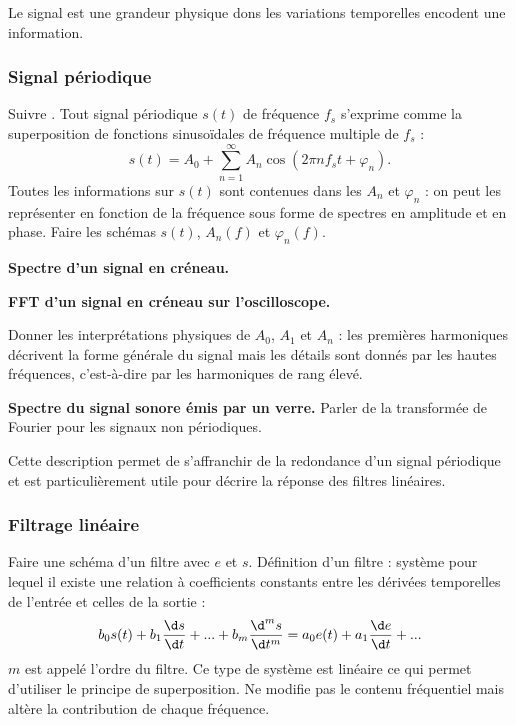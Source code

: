 Le signal est une grandeur physique dons les variations temporelles encodent une information.

\subsubsection{Signal périodique}

Suivre \cite{Salamito2017}.
Tout signal périodique $s(t)$ de fréquence $f_s$ s'exprime comme la superposition de fonctions sinusoïdales de fréquence multiple de $f_s$ :
\begin{equation}
s(t) = A_0 + \sum_{n=1}^\infty A_n \cos(2\pi n f_s t + \varphi_n).
\end{equation}
Toutes les informations sur $s(t)$ sont contenues dans les $A_n$ et $\varphi_n$ : on peut les représenter en fonction de la fréquence sous forme de spectres en amplitude et en phase.
Faire les schémas $s(t)$, $A_n(f)$ et $\varphi_n(f)$.

\begin{slide}
\textbf{Spectre d'un signal en créneau.}
\end{slide}

\begin{experience}
\textbf{FFT d'un signal en créneau sur l'oscilloscope.}
\end{experience}

Donner les interprétations physiques de $A_0$, $A_1$ et $A_n$ : les premières harmoniques décrivent la forme générale du signal mais les détails sont donnés par les hautes fréquences, c'est-à-dire par les harmoniques de rang élevé.

\begin{slide}
\textbf{Spectre du signal sonore émis par un verre.}
Parler de la transformée de Fourier pour les signaux non périodiques. 
\end{slide}

\begin{transition}
Cette description permet de s'affranchir de la redondance d'un signal périodique et est particulièrement utile pour décrire la réponse des filtres linéaires.
\end{transition}

\subsubsection{Filtrage linéaire}

Faire une schéma d'un filtre avec $e$ et $s$.
Définition d'un filtre : système pour lequel il existe une relation à coefficients constants entre les dérivées temporelles de l'entrée et celles de la sortie :
\begin{equation}
b_0 s(t) + b_1 \frac{\d s}{\d t} + ... + b_m \frac{\d^m s}{\d t^m} = a_0 e(t) + a_1 \frac{\d e}{\d t}+ ...
\end{equation}
$m$ est appelé l'ordre du filtre.
Ce type de système est linéaire ce qui permet d'utiliser le principe de superposition.
Ne modifie pas le contenu fréquentiel mais altère la contribution de chaque fréquence.

